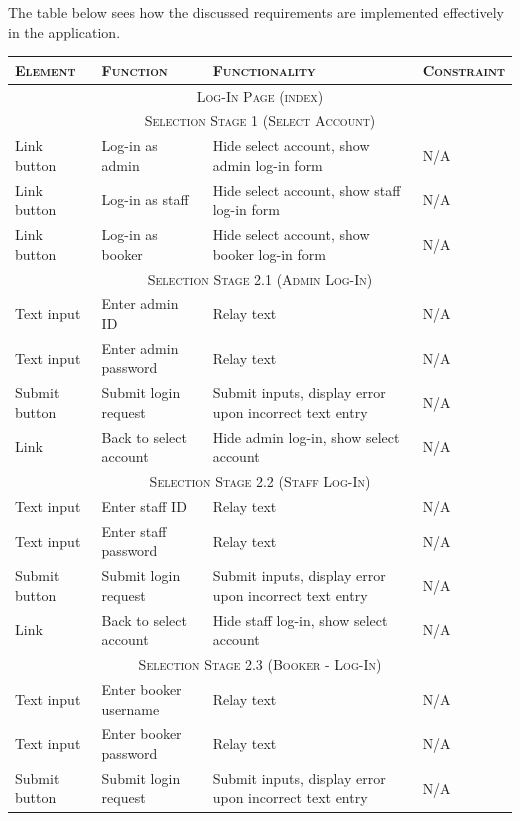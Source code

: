\documentclass[11pt, english]{article}
\begin{document}
	The table below sees how the discussed requirements are implemented effectively in the application.

	\begin{center}
		\scriptsize
	\begin{longtable}{p{3cm}p{3cm}p{4cm}p{3cm}}
		\textsc{Element} & \textsc{Function} & \textsc{Functionality} & \textsc{Constraint}\\
		\hline
		\hline
		\multicolumn{4}{c}{\textsc{Log-In Page (index)}}\\
		\hline
		\hline
		\multicolumn{4}{c}{\textsc{Selection Stage 1 (Select Account)}}\\
		\hline
		Link button & Log-in as admin & Hide select account, show admin log-in form & N/A\\
		Link button & Log-in as staff & Hide select account, show staff log-in form & N/A\\
		Link button & Log-in as booker & Hide select account, show booker log-in form & N/A\\
		\hline
		\multicolumn{4}{c}{\textsc{Selection Stage 2.1 (Admin Log-In)}}\\
		\hline
		Text input & Enter admin ID & Relay text & N/A\\
		Text input & Enter admin password & Relay text & N/A\\
		Submit button & Submit login request & Submit inputs, display error upon incorrect text entry & N/A\\
		Link & Back to select account & Hide admin log-in, show select account & N/A\\
		\hline
		\multicolumn{4}{c}{\textsc{Selection Stage 2.2 (Staff Log-In)}}\\
		\hline
		Text input & Enter staff ID & Relay text & N/A\\
		Text input & Enter staff password & Relay text & N/A\\
		Submit button & Submit login request & Submit inputs, display error upon incorrect text entry & N/A\\
		Link & Back to select account & Hide staff log-in, show select account & N/A\\
		\hline
		\multicolumn{4}{c}{\textsc{Selection Stage 2.3 (Booker - Log-In)}}\\
		\hline
		Text input & Enter booker username & Relay text & N/A\\
		Text input & Enter booker password & Relay text & N/A\\
		Submit button & Submit login request & Submit inputs, display error upon incorrect text entry & N/A\\

\end{longtable}
\end{center}
\end{document}
